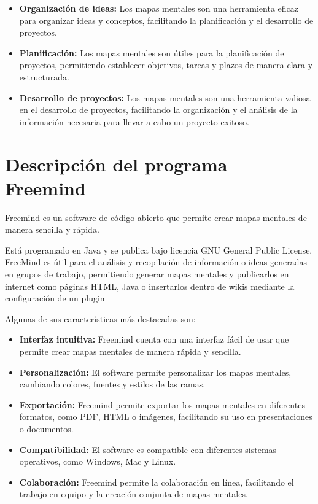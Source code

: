 \documentclass[12pt, a4paper, twoside]{article}
\begin{document}
\begin{itemize}
    \item \textbf{Organización de ideas:} Los mapas mentales son una herramienta eficaz para organizar ideas y conceptos, facilitando la planificación y el desarrollo de proyectos.
    \item \textbf{Planificación:} Los mapas mentales son útiles para la planificación de proyectos, permitiendo establecer objetivos, tareas y plazos de manera clara y estructurada.
    \item \textbf{Desarrollo de proyectos:} Los mapas mentales son una herramienta valiosa en el desarrollo de proyectos, facilitando la organización y el análisis de la información necesaria para llevar a cabo un proyecto exitoso.
 \end{itemize}
 \section{Descripción del programa Freemind}
Freemind es un software de código abierto que permite crear mapas mentales de 
manera sencilla y rápida. 

Está programado en Java y se publica bajo licencia GNU General Public License. FreeMind es útil para el análisis y recopilación de información o ideas generadas en grupos de trabajo, permitiendo generar mapas mentales y publicarlos en internet como páginas HTML, Java o insertarlos dentro de wikis mediante la configuración de un plugin

Algunas de sus características más destacadas son:
\begin{itemize}
    \item \textbf{Interfaz intuitiva:} Freemind cuenta con una interfaz fácil de usar que permite crear mapas mentales de manera rápida y sencilla.
    \item \textbf{Personalización:} El software permite personalizar los mapas mentales, cambiando colores, fuentes y estilos de las ramas.
    \item \textbf{Exportación:} Freemind permite exportar los mapas mentales en diferentes formatos, como PDF, HTML o imágenes, facilitando su uso en presentaciones o documentos.
    \item \textbf{Compatibilidad:} El software es compatible con diferentes sistemas operativos, como Windows, Mac y Linux.
    \item \textbf{Colaboración:} Freemind permite la colaboración en línea, facilitando el trabajo en equipo y la creación conjunta de mapas mentales.
 \end{itemize}
 
\end{document}
